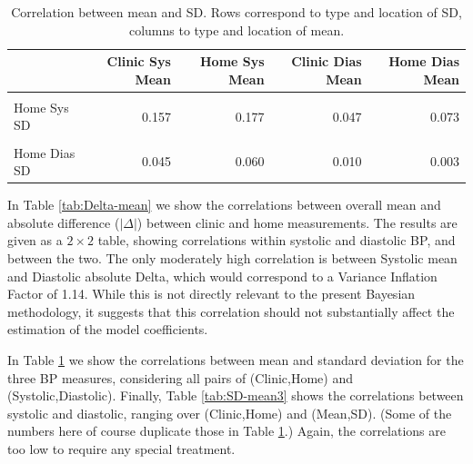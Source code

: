 \documentclass[
]{article}
\begin{document}
\begin{table}[!h]

\caption{\label{tab:SD-mean2}Correlation between mean and SD. Rows correspond to type and location of SD, columns to type and location of mean.}
\centering
\begin{tabular}[t]{lrrrr}
\toprule
  & Clinic Sys Mean & Home Sys Mean & Clinic Dias Mean & Home Dias Mean\\
\midrule
\cellcolor{gray!6}{Clinic Sys SD} & \cellcolor{gray!6}{0.269} & \cellcolor{gray!6}{0.254} & \cellcolor{gray!6}{0.095} & \cellcolor{gray!6}{0.106}\\
Home Sys SD & 0.157 & 0.177 & 0.047 & 0.073\\
\cellcolor{gray!6}{Clinic Dias SD} & \cellcolor{gray!6}{0.041} & \cellcolor{gray!6}{0.030} & \cellcolor{gray!6}{-0.076} & \cellcolor{gray!6}{-0.037}\\
Home Dias SD & 0.045 & 0.060 & 0.010 & 0.003\\
\bottomrule
\end{tabular}
\end{table}

In Table \ref{tab:Delta-mean} we show the correlations between overall mean and absolute difference (\(|\Delta|\)) between clinic and home measurements.
The results are given as a \(2\times2\) table, showing correlations within systolic and diastolic BP, and between the two.
The only moderately high correlation is between Systolic mean and Diastolic absolute Delta, which would correspond to a Variance Inflation Factor of 1.14.
While this is not directly relevant to the present Bayesian methodology, it suggests that this correlation should not substantially affect the estimation of the model coefficients.

In Table \ref{tab:SD-mean2} we show the correlations between mean and standard deviation for the three BP measures, considering all pairs of (Clinic,Home) and (Systolic,Diastolic).
Finally, Table \ref{tab:SD-mean3} shows the correlations between systolic and diastolic, ranging over (Clinic,Home) and (Mean,SD).
(Some of the numbers here of course duplicate those in Table \ref{tab:SD-mean2}.)
Again, the correlations are too low to require any special treatment.
\end{document}
